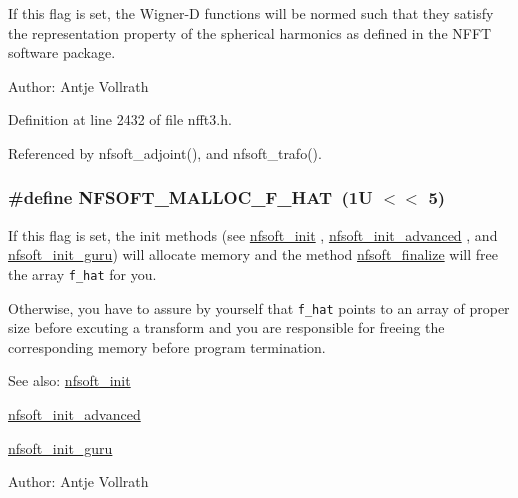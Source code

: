 If this flag is set, the Wigner-D functions will be normed such that they satisfy the representation property of the spherical harmonics as defined in the NFFT software package. 

\begin{Desc}
\item[Author:]Antje Vollrath \end{Desc}


Definition at line 2432 of file nfft3.h.

Referenced by nfsoft\_\-adjoint(), and nfsoft\_\-trafo().\hypertarget{group__nfsoft_g846e8298ed59219f7072230bd61c7a2a}{
\subsubsection{\setlength{\rightskip}{0pt plus 5cm}\#define NFSOFT\_\-MALLOC\_\-F\_\-HAT~(1U $<$$<$ 5)}}
\label{group__nfsoft_g846e8298ed59219f7072230bd61c7a2a}


If this flag is set, the init methods (see \hyperlink{group__nfsoft_g31c884458165fa204073c6c16c10775e}{nfsoft\_\-init} , \hyperlink{group__nfsoft_gf4aec4ee2a2a5d56ca27c4f1a7f90b18}{nfsoft\_\-init\_\-advanced} , and \hyperlink{group__nfsoft_g1c13cdd3f82f48fa41acdd313cdc2052}{nfsoft\_\-init\_\-guru}) will allocate memory and the method \hyperlink{group__nfsoft_g30b5c6ae1ff496680f11ddcaad2d5a47}{nfsoft\_\-finalize} will free the array {\tt f\_\-hat} for you. 

Otherwise, you have to assure by yourself that {\tt f\_\-hat} points to an array of proper size before excuting a transform and you are responsible for freeing the corresponding memory before program termination.

\begin{Desc}
\item[See also:]\hyperlink{group__nfsoft_g31c884458165fa204073c6c16c10775e}{nfsoft\_\-init} 

\hyperlink{group__nfsoft_gf4aec4ee2a2a5d56ca27c4f1a7f90b18}{nfsoft\_\-init\_\-advanced} 

\hyperlink{group__nfsoft_g1c13cdd3f82f48fa41acdd313cdc2052}{nfsoft\_\-init\_\-guru} \end{Desc}
\begin{Desc}
\item[Author:]Antje Vollrath \end{Desc}


